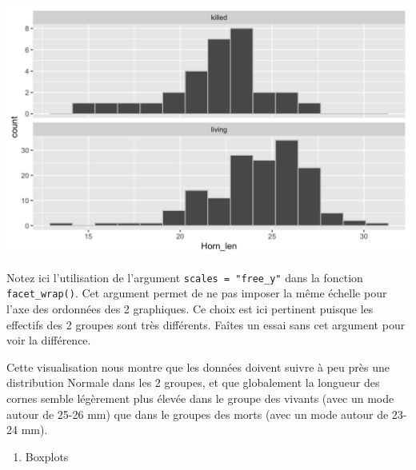 \documentclass[a4paperpaper,]{article}
\newenvironment{Shaded}{\begin{snugshade}}{\end{snugshade}}
\newcommand{\DataTypeTok}[1]{\textcolor[rgb]{0.00,0.34,0.68}{#1}}
\newcommand{\DecValTok}[1]{\textcolor[rgb]{0.69,0.50,0.00}{#1}}
\newcommand{\FloatTok}[1]{\textcolor[rgb]{0.69,0.50,0.00}{#1}}
\newcommand{\KeywordTok}[1]{\textcolor[rgb]{0.12,0.11,0.11}{\textbf{#1}}}
\newcommand{\NormalTok}[1]{\textcolor[rgb]{0.12,0.11,0.11}{#1}}
\newcommand{\OperatorTok}[1]{\textcolor[rgb]{0.12,0.11,0.11}{#1}}
\newcommand{\StringTok}[1]{\textcolor[rgb]{0.75,0.01,0.01}{#1}}
\providecommand{\tightlist}{%
  \setlength{\itemsep}{0pt}\setlength{\parskip}{0pt}}
\begin{document}
\begin{Shaded}
\end{Shaded}

\begin{center}\includegraphics[width=0.9\linewidth]{figure/unnamed-chunk-50-1} \end{center}

Notez ici l'utilisation de l'argument \texttt{scales\ =\ "free\_y"} dans la fonction \texttt{facet\_wrap()}. Cet argument permet de ne pas imposer la même échelle pour l'axe des ordonnées des 2 graphiques. Ce choix est ici pertinent puisque les effectifs des 2 groupes sont très différents. Faîtes un essai sans cet argument pour voir la différence.

Cette visualisation nous montre que les données doivent suivre à peu près une distribution Normale dans les 2 groupes, et que globalement la longueur des cornes semble légèrement plus élevée dans le groupe des vivants (avec un mode autour de 25-26 mm) que dans le groupes des morts (avec un mode autour de 23-24 mm).

\begin{enumerate}
\def\labelenumi{\arabic{enumi}.}
\setcounter{enumi}{2}
\tightlist
\item
  Boxplots
\end{enumerate}
\end{document}
